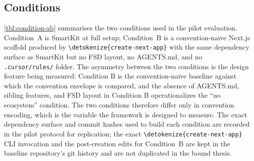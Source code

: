 \documentclass[12pt,a4paper]{report}
\newcommand{\code}[1]{\texttt{\nolinkurl{\detokenize{#1}}}}
\DeclareRobustCommand{\filename}[1]{\bgroup\urlstyle{tt}\nolinkurl{#1}\egroup}
\begin{document}
\subsection{Conditions}
\label{sec:pilot-conditions}

\autoref{tbl:condition-ab} summarises the two conditions used in the pilot evaluation. Condition~A is SmartKit at full setup; Condition~B is a convention-naive Next.js scaffold produced by \code{create-next-app} with the same dependency surface as SmartKit but no FSD layout, no AGENTS.md, and no \filename{.cursor/rules/} folder. The asymmetry between the two conditions is the design feature being measured: Condition B is the convention-naive baseline against which the convention envelope is compared, and the absence of AGENTS.md, sibling features, and FSD layout in Condition B operationalizes the ``no ecosystem'' condition. The two conditions therefore differ only in convention encoding, which is the variable the framework is designed to measure. The exact dependency surface and commit hashes used to build each condition are recorded in the pilot protocol for replication; the exact \code{create-next-app} CLI invocation and the post-creation edits for Condition~B are kept in the baseline repository's git history and are not duplicated in the bound thesis.
\end{document}
